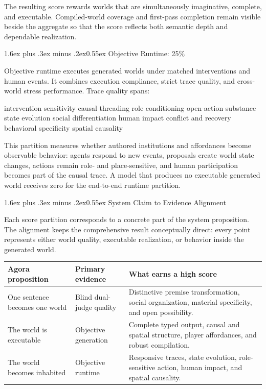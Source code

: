 \documentclass[11pt,a4paper]{article}
\makeatletter
\renewcommand\subsection{\@startsection{subsection}{2}{0pt}%
  {1.6ex plus .3ex minus .2ex}{0.55ex}%
  {\color{AgoraTeal}\sffamily\large\bfseries}}
\makeatother
\begin{document}
The resulting score rewards worlds that are simultaneously imaginative, complete, and executable.
Compiled-world coverage and first-pass completion remain visible beside the aggregate so that the
score reflects both semantic depth and dependable realization.

\subsection{Objective Runtime: 25\%}

Objective runtime executes generated worlds under matched interventions and human events. It combines
execution compliance, strict trace quality, and cross-world stress performance. Trace quality spans:

\begin{center}
\small\sffamily\color{AgoraInk}
intervention sensitivity \quad causal threading \quad role conditioning \quad open-action substance\\
state evolution \quad social differentiation \quad human impact \quad conflict and recovery\\
behavioral specificity \quad spatial causality
\end{center}

This partition measures whether authored institutions and affordances become observable behavior:
agents respond to new events, proposals create world state changes, actions remain role- and
place-sensitive, and human participation becomes part of the causal trace. A model that produces no
executable generated world receives zero for the end-to-end runtime partition.

\subsection{System Claim to Evidence Alignment}

Each score partition corresponds to a concrete part of the system proposition. The alignment keeps
the comprehensive result conceptually direct: every point represents either world quality,
executable realization, or behavior inside the generated world.

\begin{table}[H]
\centering
\small
\begin{tabularx}{\textwidth}{@{}L L L@{}}
\toprule
\textbf{Agora proposition} & \textbf{Primary evidence} & \textbf{What earns a high score} \\
\midrule
One sentence becomes one world & Blind dual-judge quality & Distinctive premise transformation, social organization, material specificity, and open possibility. \\
The world is executable & Objective generation & Complete typed output, causal and spatial structure, player affordances, and robust compilation. \\
The world becomes inhabited & Objective runtime & Responsive traces, state evolution, role-sensitive action, human impact, and spatial causality. \\
\bottomrule
\end{tabularx}
\end{table}
\end{document}
